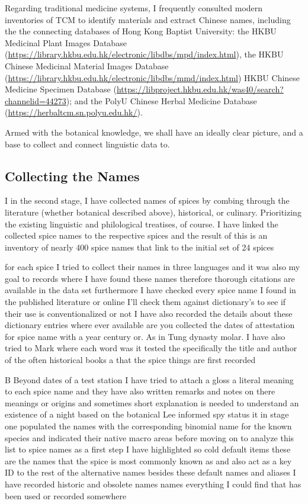 Regarding traditional medicine systems, I frequently consulted modern inventories of \gls{TCM} to identify materials and extract Chinese names, including the the connecting databases of Hong Kong Baptist University: the HKBU Medicinal Plant Images Database (\url{https://library.hkbu.edu.hk/electronic/libdbs/mpd/index.html}), the HKBU Chinese Medicinal Material Images Database (\url{https://library.hkbu.edu.hk/electronic/libdbs/mmd/index.html}) HKBU Chinese Medicine Specimen Database (\url{https://libproject.hkbu.edu.hk/was40/search?channelid=44273}); and the PolyU Chinese Herbal Medicine Database (\url{https://herbaltcm.sn.polyu.edu.hk/}).


Armed with the botanical knowledge, we shall have an ideally clear picture, and a base to collect and connect linguistic data to.



\subsection{Collecting the Names}

I in the second stage, I have collected names of spices by combing through the literature (whether botanical described above), historical, or culinary. Prioritizing the existing linguistic and philological treatises, of course. I have linked the collected spice names to the respective spices and the result of this is an inventory of nearly 400 spice names that link to the initial set of 24 spices
  
    for each spice I tried to collect their names in three languages and it was also my goal to records where I have found these names therefore thorough citations are available in the data set furthermore I have checked every spice name I found in the published literature or online I'll check them against dictionary's to see if their use is conventionalized or not   I have also recorded the details about these dictionary entries where ever available are you collected the dates of attestation for spice name with a year century or. As in Tung dynasty molar. I have also tried to Mark where each word was it tested the specifically the title and author of the often historical books  a that the spice things are first recorded 

 B Beyond dates of a test station I have tried to attach a gloss a literal meaning to each spice name and they have also written remarks and notes on there meanings or origins and sometimes short explanation is needed to understand an existence of a night based on the botanical Lee informed spy status it in stage one populated the names with the corresponding   binomial name for the known species and indicated their native macro areas before moving on to analyze this list to spice names as a first step I have highlighted so cold default items these are the names that the spice is most commonly known as and also act as a key ID   to the rest of the alternative names besides these default names and aliases I have recorded historic and obsolete names names everything I could find that has been used or recorded somewhere 
 
